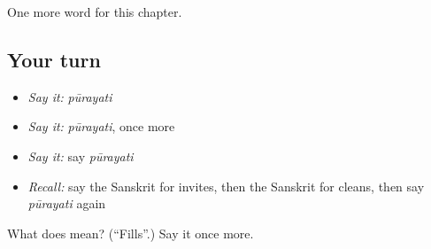 \begin{grammarlens}[title={What you've built}]
One more word for this chapter.
\end{grammarlens}

\subsection*{Your turn}
\begin{itemize}
\raggedright
  \item \emph{Say it:} \emph{pūrayati}
  \item \emph{Say it:} \emph{pūrayati}, once more
  \item \emph{Say it:} say \emph{pūrayati}
  \item \emph{Recall:} say the Sanskrit for invites, then the Sanskrit for cleans, then say \emph{pūrayati} again
\end{itemize}

\begin{tcolorbox}[breakable,colback=teal!4,colframe=teal!35!black,title={Before you move on}]
What does  mean? (\textquotedblleft{}Fills\textquotedblright{}.) Say it once more.
\end{tcolorbox}
